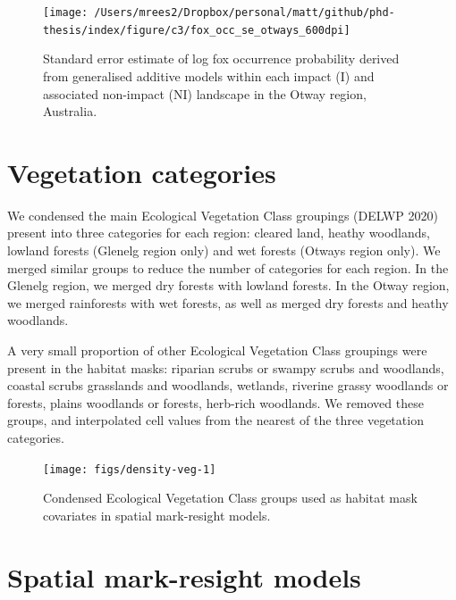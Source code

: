 \documentclass[]{elsarticle} %
\begin{document}
\newpage

\begin{figure}

{\centering \texttt{[image: /Users/mrees2/Dropbox/personal/matt/github/phd-thesis/index/figure/c3/fox\_occ\_se\_otways\_600dpi]} 

}

\caption{Standard error estimate of log fox occurrence probability derived from generalised additive models within each impact (I) and associated non-impact (NI) landscape in the Otway region, Australia.}\label{fig:density-fox-se-o}
\end{figure}

\newpage

\hypertarget{density-app-veg}{%
\section{Vegetation categories}\label{density-app-veg}}

We condensed the main Ecological Vegetation Class groupings (DELWP 2020) present into three categories for each region: cleared land, heathy woodlands, lowland forests (Glenelg region only) and wet forests (Otways region only). We merged similar groups to reduce the number of categories for each region. In the Glenelg region, we merged dry forests with lowland forests. In the Otway region, we merged rainforests with wet forests, as well as merged dry forests and heathy woodlands.

A very small proportion of other Ecological Vegetation Class groupings were present in the habitat masks: riparian scrubs or swampy scrubs and woodlands, coastal scrubs grasslands and woodlands, wetlands, riverine grassy woodlands or forests, plains woodlands or forests, herb-rich woodlands. We removed these groups, and interpolated cell values from the nearest of the three vegetation categories.

\newpage

\begin{figure}

{\centering \texttt{[image: figs/density-veg-1]} 

}

\caption{Condensed Ecological Vegetation Class groups used as habitat mask covariates in spatial mark-resight models.}\label{fig:density-veg}
\end{figure}

\newpage

\hypertarget{spatial-mark-resight-models}{%
\section{Spatial mark-resight models}\label{spatial-mark-resight-models}}
\end{document}
